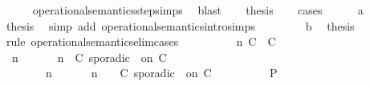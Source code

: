 \begin{isabellebody}
\ \ \ \ \isamarkupfalse%
\ operational{\isacharunderscore}semantics{\isacharunderscore}step{\isachardot}simps\ \isamarkupfalse%
\ blast\isanewline
\ \ \isamarkupfalse%
\ {\isacharquery}thesis\isanewline
\ \ \isamarkupfalse%
\ {\isacharparenleft}cases{\isacharparenright}\isanewline
\ \ \ \ \isamarkupfalse%
\ a\isanewline
\ \ \ \ \ \ \isamarkupfalse%
\ {\isacharquery}thesis\ \isamarkupfalse%
\ {\isacharparenleft}simp\ add{\isacharcolon}\ operational{\isacharunderscore}semantics{\isacharunderscore}intro{\isachardot}simps{\isacharparenright}\isanewline
\ \ \isamarkupfalse%
\isanewline
\ \ \ \ \isamarkupfalse%
\ b\ \isamarkupfalse%
\ {\isacharquery}thesis\isanewline
\ \ \ \ \isamarkupfalse%
\ {\isacharparenleft}rule\ operational{\isacharunderscore}semantics{\isacharunderscore}elim{\isachardot}cases{\isacharparenright}\isanewline
\ \ \ \ \ \ \isamarkupfalse%
\ \ {\isasymGamma}\ n\ C\ {\isasymtau}\ C\ {\isasymPsi}\ {\isasymPhi}\isanewline
\ \ \ \ \ \ \isamarkupfalse%
\ {\isacartoucheopen}{\isacharparenleft}{\isasymGamma}\ n\ {\isasymturnstile}\ {\isasymPsi}\ {\isasymtriangleright}\ {\isasymPhi}\ {\isacharequal}\ {\isacharparenleft}{\isasymGamma}{\isacharcomma}\ n\ {\isasymturnstile}\ {\isacharparenleft}C\ sporadic\ {\isasymtau}\ on\ C\ {\isacharhash}\ {\isasymPsi}\ {\isasymtriangleright}\ {\isasymPhi}{\isacharparenright}{\isacartoucheclose}\isanewline
\ \ \ \ \ \ \ {\isacartoucheopen}{\isacharparenleft}{\isasymGamma}\ n\ {\isasymturnstile}\ {\isasymPsi}\ {\isasymtriangleright}\ {\isasymPhi}\ {\isacharequal}\ {\isacharparenleft}{\isasymGamma}{\isacharcomma}\ n\ {\isasymturnstile}\ {\isasymPsi}\ {\isasymtriangleright}\ {\isacharparenleft}{\isacharparenleft}C\ sporadic\ {\isasymtau}\ on\ C\ {\isacharhash}\ {\isasymPhi}{\isacharparenright}{\isacharparenright}{\isacartoucheclose}\isanewline
\ \ \ \ \ \ \isamarkupfalse%
\ {\isacharquery}P\ \isamarkupfalse%

\end{isabellebody}
